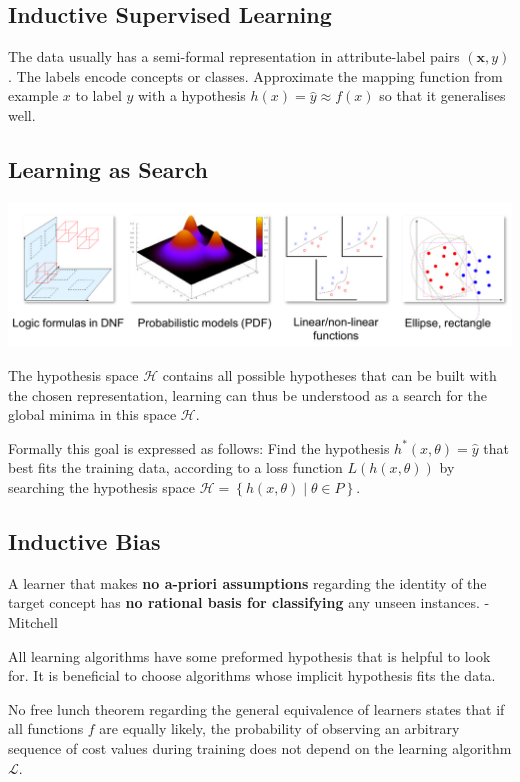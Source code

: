 \documentclass[11pt]{article}
\theoremstyle{definition}
\begin{document}
\subsection{Inductive Supervised Learning}
The data usually has a semi-formal representation in attribute-label pairs $(\textbf{x}, y)$. The labels encode concepts or classes.
Approximate the mapping function from example $x$ to label $y$ with a hypothesis $h(x) = \hat{y} \approx f(x)$ so that it generalises well.

\subsection{Learning as Search}
\begin{center}
	\includegraphics[width=0.7\linewidth]{"../Machine Learning in Computer Visualisation/img/hypothesis_space"}
\end{center}

The hypothesis space $\mathcal{H}$ contains all possible hypotheses that can be built with the chosen representation, learning can thus be understood as a search for the global minima in this space $\mathcal{H}$.

\noindent
Formally this goal is expressed as follows: Find the hypothesis $h^* (x,\theta) = \hat{y}$ that best fits the training data, according to a loss function $L(h(x,\theta))$ by searching the hypothesis space $\mathcal{H} = \left\{ h(x,\theta) \middle| \theta \in P\right\}$.

\subsection{Inductive Bias}
\begin{theorem}
	A learner that makes \textbf{no a-priori assumptions} regarding the identity of the target concept has \textbf{no rational basis for classifying} any unseen instances. - Mitchell
\end{theorem}
All learning algorithms have some preformed hypothesis that is helpful to look for. It is beneficial to choose algorithms whose implicit hypothesis fits the data.

No free lunch theorem regarding the general equivalence of learners states that if all functions $f$ are equally likely, the probability of observing an arbitrary sequence of cost values during training does not depend on the learning algorithm $\mathcal{L}$.
\end{document}
